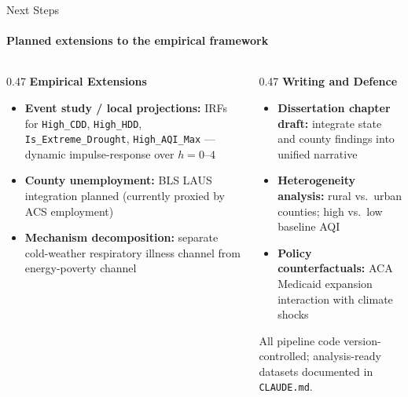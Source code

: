 \documentclass[aspectratio=169,11pt]{beamer}
\newcommand{\emphcolor}[1]{{\color{WarmOrange}\textbf{#1}}}
\newcommand{\tealtext}[1]{{\color{Teal}#1}}
\begin{document}
\begin{frame}{Next Steps}
  \framesubtitle{Planned extensions to the empirical framework}
  \begin{columns}[T]
    \begin{column}{0.47\textwidth}
      \textbf{\tealtext{Empirical Extensions}}
      \begin{itemize}\itemsep0.35em
        \item \emphcolor{Event study / local projections:} IRFs for \texttt{High\_CDD}, \texttt{High\_HDD}, \texttt{Is\_Extreme\_Drought}, \texttt{High\_AQI\_Max} — dynamic impulse-response over $h = 0$--$4$
        \item \emphcolor{County unemployment:} BLS LAUS integration planned (currently proxied by ACS employment)
        \item \emphcolor{Mechanism decomposition:} separate cold-weather respiratory illness channel from energy-poverty channel
      \end{itemize}
    \end{column}
    \begin{column}{0.47\textwidth}
      \textbf{\tealtext{Writing and Defence}}
      \begin{itemize}\itemsep0.35em
        \item \emphcolor{Dissertation chapter draft:} integrate state and county findings into unified narrative
        \item \emphcolor{Heterogeneity analysis:} rural vs.\ urban counties; high vs.\ low baseline AQI
        \item \emphcolor{Policy counterfactuals:} ACA Medicaid expansion interaction with climate shocks
      \end{itemize}
      \vspace{0.6em}
      \tealtext{\small All pipeline code version-controlled; analysis-ready datasets documented in \texttt{CLAUDE.md}.}
    \end{column}
  \end{columns}
\end{frame}
\end{document}

